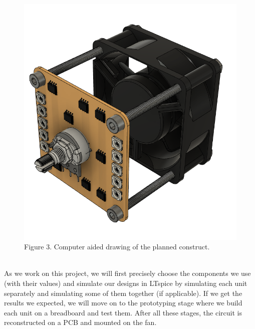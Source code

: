 \documentclass{METUHW} %
\begin{document}
\begin{figure}[H]
\includegraphics[scale=0.20]{figure/fig5.png}\\
\centering
Figure 3. Computer aided drawing of the planned construct.
\end{figure}

\\

	As we work on this project, we will first precisely choose the components we use (with their values) and simulate our designs in LTspice by simulating each unit separately and simulating some of them together (if applicable). If we get the results we expected, we will move on to the prototyping stage where we build each unit on a breadboard and test them. After all these stages, the circuit is reconstructed on a PCB and mounted on the fan.
	
\vspace{-2em}

 
\end{document}
